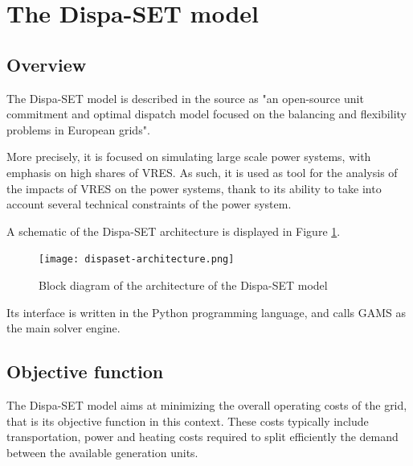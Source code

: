 \section{The Dispa-SET model}

\subsection{Overview}

The Dispa-SET model \cite{dispaset} is described in the source \cite{dispaset2} as "an open-source unit commitment and optimal dispatch model focused on the balancing and flexibility problems in European grids".

More precisely, it is focused on simulating large scale power systems, with emphasis on high shares of VRES. As such, it is used as tool for the analysis of the impacts of VRES on the power systems, thank to its ability to take into account several technical constraints of the power system.

A schematic of the Dispa-SET architecture is displayed in Figure \ref{dispaset-architecture}.

\begin{figure}[h]
    \texttt{[image: dispaset-architecture.png]}
    \caption{Block diagram of the architecture of the Dispa-SET model}
    \label{dispaset-architecture}
\end{figure}

Its interface is written in the Python programming language, and calls GAMS \cite{GAMS} as the main solver engine.

\subsection{Objective function}

The Dispa-SET model aims at minimizing the overall operating costs of the grid, that is its objective function in this context. These costs typically include transportation, power and heating costs required to split efficiently the demand between the available generation units.


